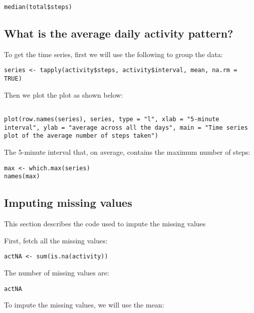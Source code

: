\documentclass[
]{article}
\begin{document}
\begin{verbatim}
median(total$steps)
\end{verbatim}

\hypertarget{what-is-the-average-daily-activity-pattern}{%
\subsection{What is the average daily activity
pattern?}\label{what-is-the-average-daily-activity-pattern}}

To get the time series, first we will use the following to group the
data:

\begin{verbatim}
series <- tapply(activity$steps, activity$interval, mean, na.rm = TRUE)
\end{verbatim}

Then we plot the plot as shown below:

\begin{verbatim}

plot(row.names(series), series, type = "l", xlab = "5-minute interval", ylab = "average across all the days", main = "Time series plot of the average number of steps taken")
\end{verbatim}

The 5-minute interval that, on average, contains the maximum number of
steps:

\begin{verbatim}
max <- which.max(series)
names(max)
\end{verbatim}

\hypertarget{imputing-missing-values}{%
\subsection{Imputing missing values}\label{imputing-missing-values}}

This section describes the code used to impute the missing values

First, fetch all the missing values:

\begin{verbatim}
actNA <- sum(is.na(activity))
\end{verbatim}

The number of missing values are:

\begin{verbatim}
actNA
\end{verbatim}

To impute the missing values, we will use the mean:
\end{document}
